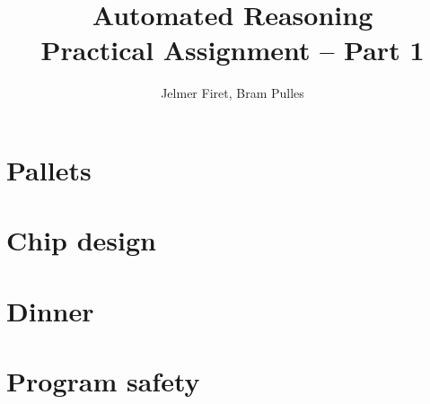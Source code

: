 \documentclass[a4paper]{article}
\author{Jelmer Firet, Bram Pulles}
\title{\textbf{Automated Reasoning\\Practical Assignment -- Part 1}}
\begin{document}
\maketitle

\section{Pallets}


\section{Chip design}


\section{Dinner}


\section{Program safety}
\end{document}
